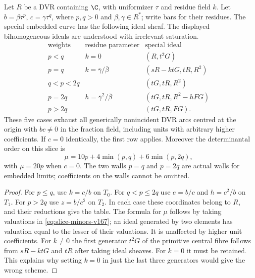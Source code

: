 \begin{corollary}
\label{cor:slice-chambers-v167}
Let $R$ be a DVR containing $\C$, with uniformizer $\tau$ and
residue field $k$. Let $b=\beta\tau^p$, $c=\gamma\tau^q$, where
$p,q>0$ and $\beta,\gamma\in R^*$; write bars for their residues.
The special embedded curve
has the following ideal sheaf. The displayed bihomogeneous
ideals are understood with irrelevant saturation.
\begin{equation}\label{eq:slice-table-v167}
\begin{array}{c|c|c}
 \text{weights}&\text{residue parameter}&\text{special ideal}\\ \hline
 p<q&k=0&(R,t^2G)\\
 p=q&k=\bar\gamma/\bar\beta&(sR-ktG,tR,R^2)\\
 q<p<2q&& (tG,tR,R^2)\\
 p=2q&h=\bar\gamma^2/\bar\beta&(tG,tR,R^2-hFG)\\
 p>2q&& (tG,tR,FG).
\end{array}
\end{equation}
These five cases exhaust all generically nonincident DVR arcs
centred at the origin with $bc\ne0$ in the fraction field,
including units with arbitrary higher coefficients. If $c=0$
identically, the first row applies. Moreover the determinantal
order on this slice is
\begin{equation}\label{eq:slice-jet-order-v167}
 \mu=10p+4\min(p,q)+6\min(p,2q),
\end{equation}
with $\mu=20p$ when $c=0$.
The two walls $p=q$ and $p=2q$ are actual walls for embedded
limits; coefficients on the walls cannot be omitted.
\end{corollary}
\begin{proof}
For $p\leq q$, use $k=c/b$ on $T_0$. For $q<p\leq2q$ use
$e=b/c$ and $h=c^2/b$ on $T_1$. For $p>2q$ use $z=b/c^2$
on $T_2$. In each case these coordinates belong to $R$, and their
reductions give the table. The formula for $\mu$ follows by taking valuations in
\eqref{eq:slice-minors-v167}; an ideal generated by two elements
has valuation equal to the lesser of their valuations. It is
unaffected by higher unit coefficients. For $k\ne0$ the first generator
$t^2G$ of the primitive central fibre follows from
$sR-ktG$ and $tR$ after taking ideal sheaves. For $k=0$ it must
be retained. This explains why setting $k=0$ in just the last
three generators would give the wrong scheme.
\end{proof}

